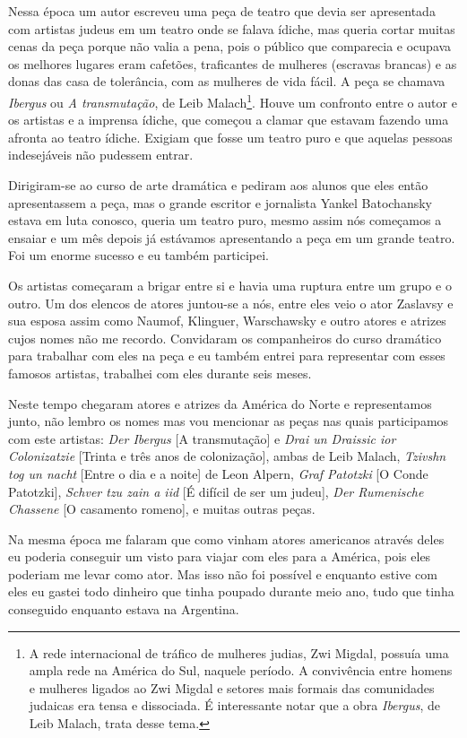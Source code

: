 Nessa época um autor escreveu uma peça de teatro que devia ser
apresentada com artistas judeus em um teatro onde se falava ídiche, mas
queria cortar muitas cenas da peça porque não valia a pena, pois o
público que comparecia e ocupava os melhores lugares eram cafetões,
traficantes de mulheres (escravas brancas) e as donas das casa de
tolerância, com as mulheres de vida fácil. A peça se chamava
\textit{Ibergus} ou \textit{A transmutação}, de Leib Malach\footnote{A rede
  internacional de tráfico de mulheres judias, Zwi Migdal, possuía uma
  ampla rede na América do Sul, naquele período. A convivência entre
  homens e mulheres ligados ao Zwi Migdal e setores mais formais das
  comunidades judaicas era tensa e dissociada. É interessante notar que
  a obra \textit{Ibergus}, de Leib Malach, trata desse tema.}. Houve um confronto
entre o autor e os artistas e a imprensa ídiche, que começou a clamar
que estavam fazendo uma afronta ao teatro ídiche. Exigiam que fosse um
teatro puro e que aquelas pessoas indesejáveis não pudessem entrar.

Dirigiram-se ao curso de arte dramática e pediram aos alunos que eles
então apresentassem a peça, mas o grande escritor e jornalista Yankel
Batochansky estava em luta conosco, queria um teatro puro, mesmo assim
nós começamos a ensaiar e um mês depois já estávamos apresentando a peça
em um grande teatro. Foi um enorme sucesso e eu também participei.

Os artistas começaram a brigar entre si e havia uma ruptura entre um
grupo e o outro. Um dos elencos de atores juntou-se a nós, entre eles
veio o ator Zaslavsy e sua esposa assim como Naumof, Klinguer,
Warschawsky e outro atores e atrizes cujos nomes não me recordo.
Convidaram os companheiros do curso dramático para trabalhar com eles na
peça e eu também entrei para representar com esses famosos artistas,
trabalhei com eles durante seis meses.

Neste tempo chegaram atores e atrizes da América do Norte e
representamos junto, não lembro os nomes mas vou mencionar as peças nas
quais participamos com este artistas: \textit{Der Ibergus} [A
transmutação] e \textit{Drai un Draissic ior Colonizatzie} [Trinta e três
anos de colonização], ambas de Leib Malach, \textit{Tzivshn tog un nacht}
[Entre o dia e a noite] de Leon Alpern, \textit{Graf Patotzki} [O Conde
Patotzki], \textit{Schver tzu zain a iid} [É difícil de ser um
judeu], \textit{Der Rumenische Chassene} [O casamento romeno], e
muitas outras peças.

Na mesma época me falaram que como vinham atores americanos através
deles eu poderia conseguir um visto para viajar com eles para a América,
pois eles poderiam me levar como ator. Mas isso não foi possível e
enquanto estive com eles eu gastei todo dinheiro que tinha poupado
durante meio ano, tudo que tinha conseguido enquanto estava na
Argentina.

